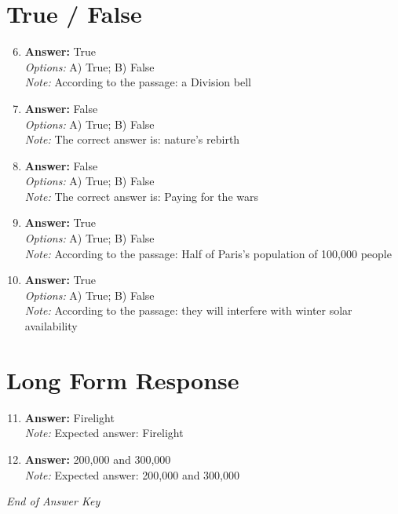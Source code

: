 \documentclass[12pt]{article}
\begin{document}
\section*{True / False}
\begin{enumerate}[label=\arabic*.]
\setcounter{enumi}{5}
\item \textbf{Answer:} True
\\ \textit{Options:} A) True; B) False
\\ \textit{Note:} According to the passage: a Division bell
\item \textbf{Answer:} False
\\ \textit{Options:} A) True; B) False
\\ \textit{Note:} The correct answer is: nature's rebirth
\item \textbf{Answer:} False
\\ \textit{Options:} A) True; B) False
\\ \textit{Note:} The correct answer is: Paying for the wars
\item \textbf{Answer:} True
\\ \textit{Options:} A) True; B) False
\\ \textit{Note:} According to the passage: Half of Paris's population of 100,000 people
\item \textbf{Answer:} True
\\ \textit{Options:} A) True; B) False
\\ \textit{Note:} According to the passage: they will interfere with winter solar availability
\end{enumerate}

\section*{Long Form Response}
\begin{enumerate}[label=\arabic*.]
\setcounter{enumi}{10}
\item \textbf{Answer:} Firelight
\\ \textit{Note:} Expected answer: Firelight
\item \textbf{Answer:} 200,000 and 300,000
\\ \textit{Note:} Expected answer: 200,000 and 300,000
\end{enumerate}

\vfill
\noindent\textit{End of Answer Key}
\end{document}
